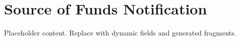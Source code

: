 

\section*{Source of Funds Notification}
Placeholder content. Replace with dynamic fields and generated fragments.

